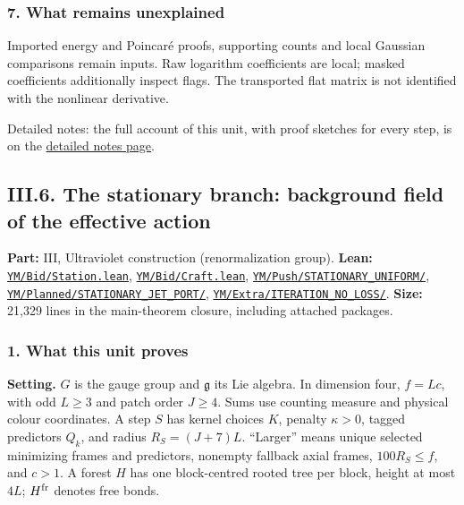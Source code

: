 \documentclass[
  letterpaper,
  11pt]{article}
\newcounter{none} %
\begin{document}
\subsubsection{7. What remains
unexplained}\label{what-remains-unexplained-7}

Imported energy and Poincaré proofs, supporting counts and local
Gaussian comparisons remain inputs. Raw logarithm coefficients are
local; masked coefficients additionally inspect flags. The transported
flat matrix is not identified with the nonlinear derivative.

Detailed notes: the full account of this unit, with proof sketches for
every step, is on the
\href{https://github.com/scottnarmstrong/yang-mills-informalization/blob/main/outline/notes/III-5.md}{detailed
notes page}.

\subsection{III.6. The stationary branch: background field of the
effective
action}\label{iii.6.-the-stationary-branch-background-field-of-the-effective-action}

\textbf{Part:} III, Ultraviolet construction (renormalization group).
\textbf{Lean:}
\href{https://github.com/yang-mills-group/OpenAI-YM-20261028/blob/3456e5e75cf8d4cd558955a5c7638fba2d68f464/YM/Bid/Station.lean}{\texttt{YM/Bid/Station.lean}},
\href{https://github.com/yang-mills-group/OpenAI-YM-20261028/blob/3456e5e75cf8d4cd558955a5c7638fba2d68f464/YM/Bid/Craft.lean}{\texttt{YM/Bid/Craft.lean}},
\href{https://github.com/yang-mills-group/OpenAI-YM-20261028/tree/3456e5e75cf8d4cd558955a5c7638fba2d68f464/YM/Push/STATIONARY_UNIFORM}{\texttt{YM/Push/STATIONARY\_UNIFORM/}},
\href{https://github.com/yang-mills-group/OpenAI-YM-20261028/tree/3456e5e75cf8d4cd558955a5c7638fba2d68f464/YM/Planned/STATIONARY_JET_PORT}{\texttt{YM/Planned/STATIONARY\_JET\_PORT/}},
\href{https://github.com/yang-mills-group/OpenAI-YM-20261028/tree/3456e5e75cf8d4cd558955a5c7638fba2d68f464/YM/Extra/ITERATION_NO_LOSS}{\texttt{YM/Extra/ITERATION\_NO\_LOSS/}}.
\textbf{Size:} 21,329 lines in the main-theorem closure, including
attached packages.

\subsubsection{1. What this unit proves}\label{what-this-unit-proves-8}

\textbf{Setting.} \(G\) is the gauge group and \(\mathfrak g\) its Lie
algebra. In dimension four, \(f=Lc\), with odd \(L\ge3\) and patch order
\(J\ge4\). Sums use counting measure and physical colour coordinates. A
step \(S\) has kernel choices \(K\), penalty \(\kappa>0\), tagged
predictors \(Q_k\), and radius \(R_S=(J+7)L\). ``Larger'' means unique
selected minimizing frames and predictors, nonempty fallback axial
frames, \(100R_S\le f\), and \(c>1\). A forest \(H\) has one
block-centred rooted tree per block, height at most \(4L\);
\(H^{\rm fr}\) denotes free bonds.
\end{document}
